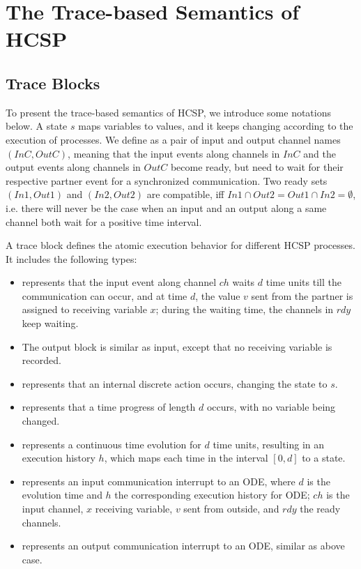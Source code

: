 \documentclass{llncs}
\begin{document}
 \section{The Trace-based Semantics of HCSP}
 
 \subsection{Trace Blocks}
 
 To present the trace-based semantics of HCSP, we introduce some notations below. A state $s$ maps variables to values, and it keeps changing according to the execution of processes.
 We define  as  a pair of input and output channel names $(InC, OutC)$, meaning that the input events along channels in $InC$ and the output events along channels in $OutC$ become ready, but need to wait for their respective partner event for a synchronized communication.   Two ready sets $(In1, Out1)$ and $(In2, Out2)$ are compatible, iff
 $In1 \cap Out2 = Out1 \cap In2 = \emptyset$, i.e. there will never be the case when an input and an output along a same channel both wait for a positive time interval. 
 
 
 
 A trace block  defines the atomic execution behavior for different HCSP processes. It 
 includes the following types: 
 \begin{itemize}
   \item {} represents that the input event along channel $ch$ waits $d$ time units till the communication can occur, and at time $d$, the value $v$ sent from the partner is assigned to receiving variable $x$;  during the waiting time, the  channels in $rdy$ keep waiting. 
  \item The output block  is similar as input, except that no receiving variable is recorded.
  \item  {} represents that an internal discrete action occurs, changing the state to $s$.
  \item {} represents that a time progress of length $d$ occurs, with no variable being changed.
  \item {} represents a continuous time evolution for $d$ time units, resulting in an execution history $h$, which
 maps each time in the interval $[0,d]$ to a state.
 \item {} represents an input communication interrupt  to an ODE, where $d$ is the evolution time and $h$ the corresponding execution history for ODE; $ch$ is the input channel, $x$ receiving variable, $v$ sent from outside, and $rdy$ the ready channels. 
\item {} represents an output communication interrupt to an ODE, similar as above case. 
 
 \end{itemize}
 
\end{document}
